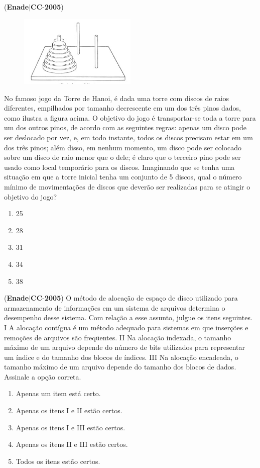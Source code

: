 \documentclass{exam}
\begin{document}
\begin{questions}
\question (\textbf{Enade}$|$\textbf{CC}-\textbf{2005}) \begin{figure}[H]
	\begin{center}
		\includegraphics[width=0.5\textwidth]{CIENCIA_DA_COMPUTACAO_Prova2005-utf8_figuras/fig-0018.jpg}
	\end{center}
\end{figure}
No famoso jogo da Torre de Hanoi, é dada uma torre
com discos de raios diferentes, empilhados por tamanho
decrescente em um dos três pinos dados, como ilustra a figura
acima. O objetivo do jogo é transportar-se toda a torre para
um dos outros pinos, de acordo com as seguintes regras:
apenas um disco pode ser deslocado por vez, e, em todo
instante, todos os discos precisam estar em um dos três pinos;
além disso, em nenhum momento, um disco pode ser colocado
sobre um disco de raio menor que o dele; é claro que o
terceiro pino pode ser usado como local temporário para os
discos.
Imaginando que se tenha uma situação em que a torre inicial tenha
um conjunto de 5 discos, qual o número mínimo de movimentações
de discos que deverão ser realizadas para se atingir o objetivo do
jogo?
	\begin{enumerate}[label=\alph*)]
		\item  25
		\item  28
		\item  31
		\item  34
		\item  38

	\end{enumerate}

\question (\textbf{Enade}$|$\textbf{CC}-\textbf{2005}) O método de alocação de espaço de disco utilizado para
armazenamento de informações em um sistema de arquivos
determina o desempenho desse sistema. Com relação a esse assunto,
julgue os itens seguintes.
I A alocação contígua é um método adequado para sistemas em
que inserções e remoções de arquivos são freqüentes.
II Na alocação indexada, o tamanho máximo de um arquivo
depende do número de bits utilizados para representar um índice
e do tamanho dos blocos de índices.
III Na alocação encadeada, o tamanho máximo de um arquivo
depende do tamanho dos blocos de dados.
Assinale a opção correta.
	\begin{enumerate}[label=\alph*)]
		\item  Apenas um item está certo.
		\item  Apenas os itens I e II estão certos.
		\item  Apenas os itens I e III estão certos.
		\item  Apenas os itens II e III estão certos.
		\item  Todos os itens estão certos.


\end{enumerate}
\end{questions}
\end{document}

